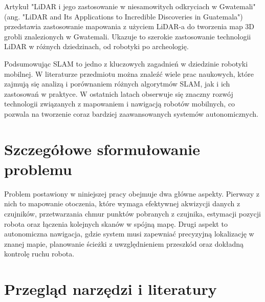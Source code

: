 \documentclass[a4paper,twoside,12pt]{book}
\begin{document}
 \newline
 Artykuł "LiDAR i jego zastosowanie w niesamowitych odkryciach w Gwatemali" (ang. "LiDAR and Its Applications to Incredible Discoveries in Guatemala") \cite{bib:kangreal} przedstawia zastosowanie mapowania z użyciem LiDAR-a do tworzenia map 3D grobli znalezionych w Gwatemali. Ukazuje to szerokie zastosowanie technologii LiDAR w różnych dziedzinach, od robotyki po archeologię.
 
 
 Podsumowując SLAM to jedno z kluczowych zagadnień w dziedzinie robotyki mobilnej. W literaturze przedmiotu można znaleźć wiele prac naukowych, które zajmują się analizą i porównaniem różnych algorytmów SLAM, jak i ich zastosowań w praktyce. W ostatnich latach obserwuje się znaczny rozwój technologii związanych z mapowaniem i nawigacją robotów mobilnych, co pozwala na tworzenie coraz bardziej zaawansowanych systemów autonomicznych.



\section{Szczegółowe sformułowanie problemu}
Problem postawiony w niniejszej pracy obejmuje dwa główne aspekty. Pierwszy z nich to mapowanie otoczenia, które wymaga efektywnej akwizycji danych z czujników, przetwarzania chmur punktów pobranych z czujnika, estymacji pozycji robota oraz łączenia kolejnych skanów w spójną mapę. Drugi aspekt to autonomiczna nawigacja, gdzie system musi zapewniać precyzyjną lokalizację w znanej mapie, planowanie ścieżki z uwzględnieniem przeszkód oraz dokładną kontrolę ruchu robota.
\newpage
\section{Przegląd narzędzi i literatury}
\end{document}

